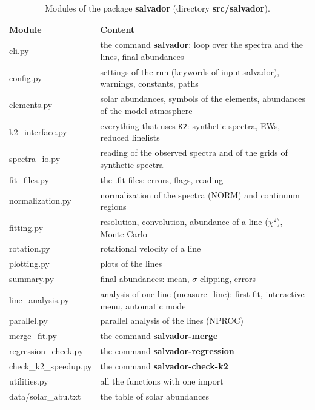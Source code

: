 \documentclass[modern]{aastex701}
\begin{document}
\begin{table}[h]
    \centering
    \caption{Modules of the package {\bf salvador} (directory {\bf src/salvador}).}
    \label{tab:modules}
    \begin{tabular}{lp{10.5cm}}
        \hline
        Module & Content \\
        \hline
        cli.py & the command {\bf salvador}: loop over the spectra and the lines, final abundances \\
        config.py & settings of the run (keywords of input.salvador), warnings, constants, paths \\
        elements.py & solar abundances, symbols of the elements, abundances of the model atmosphere \\
        k2\_interface.py & everything that uses \texttt{K2}: synthetic spectra, EWs, reduced linelists \\
        spectra\_io.py & reading of the observed spectra and of the grids of synthetic spectra \\
        fit\_files.py & the .fit files: errors, flags, reading \\
        normalization.py & normalization of the spectra (NORM) and continuum regions \\
        fitting.py & resolution, convolution, abundance of a line ($\chi^2$), Monte Carlo \\
        rotation.py & rotational velocity of a line \\
        plotting.py & plots of the lines \\
        summary.py & final abundances: mean, $\sigma$-clipping, errors \\
        line\_analysis.py & analysis of one line (measure\_line): first fit, interactive menu, automatic mode \\
        parallel.py & parallel analysis of the lines (NPROC) \\
        merge\_fit.py & the command {\bf salvador-merge} \\
        regression\_check.py & the command {\bf salvador-regression} \\
        check\_k2\_speedup.py & the command {\bf salvador-check-k2} \\
        utilities.py & all the functions with one import \\
        data/solar\_abu.txt & the table of solar abundances \\
        \hline
    \end{tabular}
\end{table}
\end{document}
